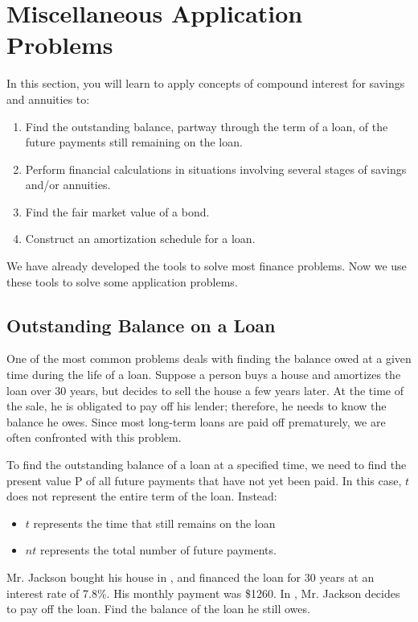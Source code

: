 \section{Miscellaneous Application Problems}

In this section, you will learn to apply concepts of compound interest for savings and annuities to:

\begin{enumerate}
    \item Find the outstanding balance, partway through the term of a loan, of the future payments still remaining on the loan.
    \item Perform financial calculations in situations involving several stages of savings and/or annuities.
    \item Find the fair market value of a bond.
    \item Construct an amortization schedule for a loan.
\end{enumerate}

We have already developed the tools to solve most finance problems. Now we use these tools to solve some application problems.

\subsection{Outstanding Balance on a Loan}

One of the most common problems deals with finding the balance owed at a given time during the life of a loan. Suppose a person buys a house and amortizes the loan over 30 years, but decides to sell the house a few years later. At the time of the sale, he is obligated to pay off his lender; therefore, he needs to know the balance he owes. Since most long-term loans are paid off prematurely, we are often confronted with this problem.

To find the outstanding balance of a loan at a specified time, we need to find the present value P of all future payments that have not yet been paid. In this case, $t$ does not represent the entire term of the loan. Instead:
\begin{itemize}
    \item $t$ represents the time that still remains on the loan
    \item $nt$ represents the total number of future payments.
\end{itemize}

\begin{example}\label{example_house_payoff}
    Mr. Jackson bought his house in \the\numexpr{}\relax, and financed the loan for 30 years at an interest rate of 7.8\%. His monthly payment was \$1260. In \the\year, Mr. Jackson decides to pay off the loan. Find the balance of the loan he still owes.
\end{example}

